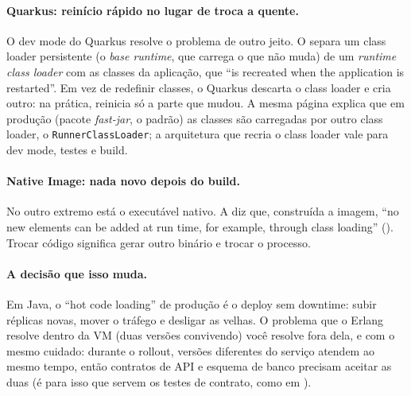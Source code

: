\paragraph{Quarkus: reinício rápido no lugar de troca a quente.}
O dev mode do Quarkus resolve o problema de outro jeito. O
 separa um class loader persistente
(o \emph{base runtime}, que carrega o que não muda) de um \emph{runtime
class loader} com as classes da aplicação, que \enquote{is recreated when
the application is restarted}. Em vez de redefinir classes, o Quarkus
descarta o class loader e cria outro: na prática, reinicia só a parte que
mudou. A mesma página explica que em produção (pacote \emph{fast-jar}, o
padrão) as classes são carregadas por outro class loader, o
\texttt{RunnerClassLoader}; a arquitetura que recria o class loader vale
para dev mode, testes e build.

\paragraph{Native Image: nada novo depois do build.}
No outro extremo está o executável nativo. A
diz que, construída a imagem, \enquote{no new elements can be added at
run time, for example, through class loading}
(). Trocar código significa gerar
outro binário e trocar o processo.

\paragraph{A decisão que isso muda.}
Em Java, o \enquote{hot code loading} de produção é o deploy sem
downtime: subir réplicas novas, mover o tráfego e desligar as velhas. O
problema que o Erlang resolve dentro da VM (duas versões convivendo) você
resolve fora dela, e com o mesmo cuidado: durante o rollout, versões
diferentes do serviço atendem ao mesmo tempo, então contratos de API e
esquema de banco precisam aceitar as duas (é para isso que servem os
testes de contrato, como em ).
